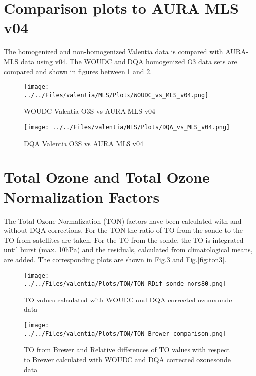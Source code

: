 \documentclass{article}
\begin{document}
\section{Comparison plots to AURA MLS v04}

    The homogenized and non-homogenized Valentia data is compared with AURA-MLS data using v04. The
    WOUDC and DQA homogenized O3 data sets are compared and shown in figures between
\ref{fig:niwav04} and \ref{fig:dqav04}.

                                \begin{figure}
        \centering
\texttt{[image: ../../Files/valentia/MLS/Plots/WOUDC\_vs\_MLS\_v04.png]}
    \caption{ WOUDC Valentia O3S vs AURA MLS v04  }
            \label{fig:niwav04}
    \end{figure}

                            \begin{figure}
        \centering
\texttt{[image: ../../Files/valentia/MLS/Plots/DQA\_vs\_MLS\_v04.png]}
    \caption{DQA Valentia O3S vs AURA MLS v04 }
            \label{fig:dqav04}
    \end{figure}

%
        \section{Total Ozone and Total Ozone Normalization Factors}

The Total Ozone Normalization (TON) factors have been calculated with and without DQA corrections. For the TON
the ratio of TO from the sonde to the TO from satellites are taken. For the TO from the sonde, the TO is integrated until
burst (max. 10hPa) and the residuals, calculated from climatological means, are added.
The corresponding plots are shown in Fig.\ref{fig:ton1} and  Fig.\ref{fig:ton3}.

                                \begin{figure}
        \centering
\texttt{[image: ../../Files/valentia/Plots/TON/TON\_RDif\_sonde\_nors80.png]}
    \caption{TO values calculated with WOUDC and DQA corrected ozonesonde data}
            \label{fig:ton1}
    \end{figure}
%
                                 \begin{figure}
        \centering
\texttt{[image: ../../Files/valentia/Plots/TON/TON\_Brewer\_comparison.png]}
    \caption{TO from Brewer and Relative differences of TO values with respect to Brewer calculated with WOUDC
    and DQA corrected ozonesonde data}
            \label{fig:ton2}
    \end{figure}
\end{document}
